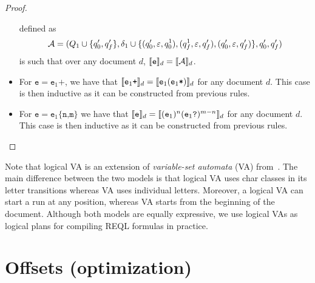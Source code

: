 \begin{proof}
\begin{itemize}
		      defined as
		      \[
			      \mathcal{A} = (Q_1 \cup \{q_0', q_f'\},
			      \delta_1 \cup \{(q_0', \varepsilon, q_0^1), (q_f^1, \varepsilon, q_f'), (q_0', \varepsilon, q_f')\},
			      q_0', q_f')
		      \]
		      is such that over any document $d$, $\llbracket\texttt{e}\rrbracket_d =
			      \llbracket\mathcal{A}\rrbracket_d$.
		\item For $\texttt{e} = \texttt{e}_1\texttt{+}$, we have that
		      $\llbracket\texttt{e}_1\texttt{+}\rrbracket_{d} =
		      \llbracket\texttt{e}_1(\texttt{e}_1\texttt{*})\rrbracket_{d}$ for any document $d$.
		      This case is then inductive as it can be constructed from previous
		      rules.
		\item For $\texttt{e} = \texttt{e}_1\texttt{\{n,m\}}$ we have that
		      $\llbracket\texttt{e}\rrbracket_d =
		      \llbracket(\texttt{e}_1)^n(\texttt{e}_1\texttt{?})^{m-n}\rrbracket_d$ for any
		      document $d$. This case is then inductive as it can be constructed
		      from previous rules.
	\end{itemize}

\end{proof}
Note that logical VA is an extension of \emph{variable-set automata} (VA)
from~\citet{FaginKRV15}. The main difference between the two models is that
logical VA uses char classes in its letter transitions whereas VA uses
individual letters. Moreover, a logical VA can start a run at any position,
whereas VA starts from the beginning of the document. Although both models are
equally expressive, we use logical VAs as logical plans for compiling REQL
formulas in practice.

\section{Offsets (optimization)}

